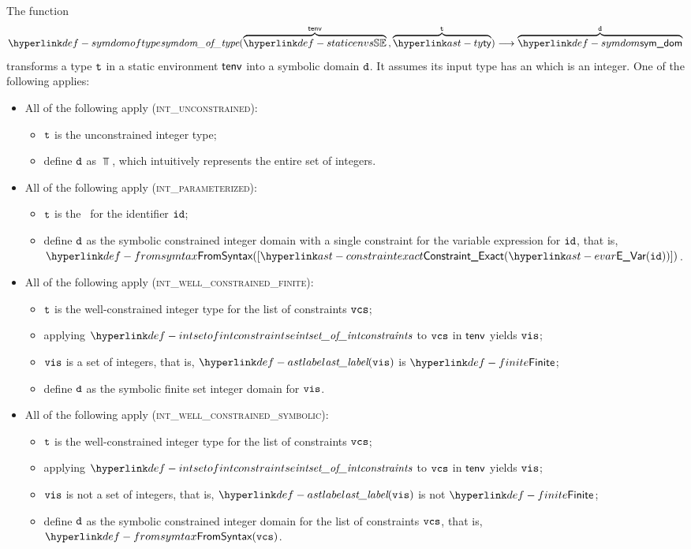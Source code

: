 \hypertarget{def-symdomoftype}{}
The function
\[
  \symdomoftype(\overname{\staticenvs}{\tenv} \aslsep \overname{\ty}{\vt}) \aslto \overname{\symdom}{\vd}
\]
transforms a type $\texttt{t}$ in a static environment $\textsf{tenv}$ into a symbolic domain $\texttt{d}$.
It assumes its input type has an \underlyingtype{} which is an integer.
\ProseParagraph
One of the following applies:
\begin{itemize}
  \item All of the following apply (\textsc{int\_unconstrained}):
  \begin{itemize}
    \item $\texttt{t}$ is the unconstrained integer type;
    \item define $\texttt{d}$ as $\Top$, which intuitively represents the entire set of integers.
  \end{itemize}

  \item All of the following apply (\textsc{int\_parameterized}):
  \begin{itemize}
    \item $\texttt{t}$ is the \parameterizedintegertype\ for the identifier $\texttt{id}$;
    \item define $\texttt{d}$ as the symbolic constrained integer domain with a single constraint for the variable expression for $\texttt{id}$,
          that is, \\ $\FromSyntax([\ConstraintExact(\EVar(\id))])$.
  \end{itemize}

  \item All of the following apply (\textsc{int\_well\_constrained\_finite}):
  \begin{itemize}
    \item $\texttt{t}$ is the well-constrained integer type for the list of constraints $\texttt{vcs}$;
    \item applying $\intsetofintconstraints$ to $\texttt{vcs}$ in $\textsf{tenv}$ yields $\texttt{vis}$;
    \item $\texttt{vis}$ is a set of integers, that is, $\astlabel(\vis)$ is $\Finite$;
    \item define $\texttt{d}$ as the symbolic finite set integer domain for $\texttt{vis}$.
  \end{itemize}

  \item All of the following apply (\textsc{int\_well\_constrained\_symbolic}):
  \begin{itemize}
    \item $\texttt{t}$ is the well-constrained integer type for the list of constraints $\texttt{vcs}$;
    \item applying $\intsetofintconstraints$ to $\texttt{vcs}$ in $\textsf{tenv}$ yields $\texttt{vis}$;
    \item $\texttt{vis}$ is not a set of integers, that is, $\astlabel(\vis)$ is not $\Finite$;
    \item define $\texttt{d}$ as the symbolic constrained integer domain for the list of constraints $\texttt{vcs}$, that is, $\FromSyntax(\vcs)$.
  \end{itemize}


\end{itemize}

